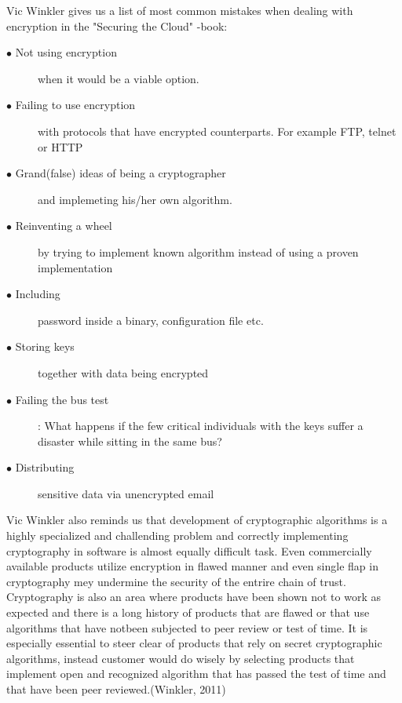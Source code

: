 \documentclass{article}
\begin{document}
\par
Vic Winkler gives us a list of most common mistakes when dealing with encryption in the "Securing the Cloud" -book:
\begin{description}
	\item[$\bullet$ Not using encryption] when it would be a viable option.
	\item[$\bullet$ Failing to use encryption] with protocols that have encrypted counterparts. For example FTP, telnet or HTTP 
	\item[$\bullet$ Grand(false) ideas of being a cryptographer] and implemeting his/her own algorithm. 
	\item[$\bullet$ Reinventing a wheel ]by trying to implement known algorithm instead of using a proven implementation
	\item[$\bullet$ Including ]password inside a binary, configuration file etc.
	\item[$\bullet$ Storing keys ]together with data being encrypted
	\item[$\bullet$ Failing the bus test]: What happens if the few critical individuals with the keys suffer a disaster while sitting in the same bus? 
	\item[$\bullet$ Distributing] sensitive data via unencrypted email
\end{description} 
Vic Winkler also reminds us that development of cryptographic algorithms is a highly specialized and challending problem and correctly implementing cryptography in software is almost equally difficult task. Even commercially available products utilize encryption in flawed manner and even single flap in cryptography mey undermine the security of the entrire chain of trust. Cryptography is also an area where products have been shown not to work as expected and there is a long history of products that are flawed or that use algorithms that have notbeen subjected to peer review or test of time. It is especially essential to steer clear of products that rely on secret cryptographic algorithms, instead customer would do wisely by selecting products that implement open and recognized algorithm that has passed the test of time and that have been peer reviewed.(Winkler, 2011)
\end{document}
